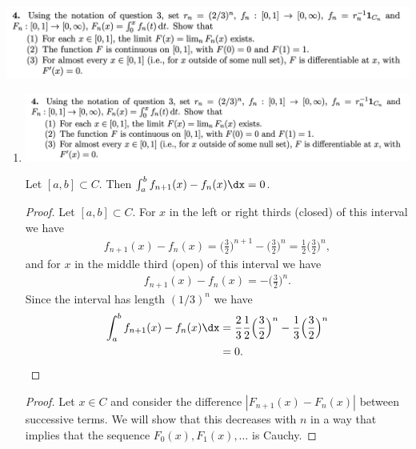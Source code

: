 \begin{mdframed}
  \includegraphics[width=400pt]{img/analysis--berkeley-202a-8ce8.png}
\end{mdframed}

\begin{enumerate}[label=(4.\arabic*)]

\item

  \includegraphics[width=400pt]{img/analysis--berkeley-202a-8ce8.png}

  \begin{lemma}\label{lemma-4-1-1}
    Let $[a, b] \subset C$. Then $\int_a^b f_{n+1}(x) - f_n(x) \dx = 0$.
  \end{lemma}

  \begin{proof}
    Let $[a, b] \subset C$. For $x$ in the left or right thirds (closed) of this interval we have
    \begin{align*}
      f_{n+1}(x) - f_n(x)
      = \Big(\frac{3}{2}\Big)^{n+1} - \Big(\frac{3}{2}\Big)^{n}
      = \frac{1}{2}\Big(\frac{3}{2}\Big)^n,
    \end{align*}
    and for $x$ in the middle third (open) of this interval we have
    \begin{align*}
      f_{n+1}(x) - f_n(x)
      = -\Big(\frac{3}{2}\Big)^{n}.
    \end{align*}
    Since the interval has length $(1/3)^n$ we have
    \begin{align*}
      \int_a^b f_{n+1}(x) - f_n(x) \dx
      &=  \frac{2}{3} \frac{1}{2}\Big(\frac{3}{2}\Big)^n
        - \frac{1}{3}\Big(\frac{3}{2}\Big)^n \\
      &= 0.
    \end{align*}
  \end{proof}

  \begin{proof}
    Let $x \in C$ and consider the difference $|F_{n+1}(x) - F_n(x)|$ between successive terms. We will show
    that this decreases with $n$ in a way that implies that the sequence $F_0(x), F_1(x), \ldots$ is Cauchy.


\end{proof}
\end{enumerate}
